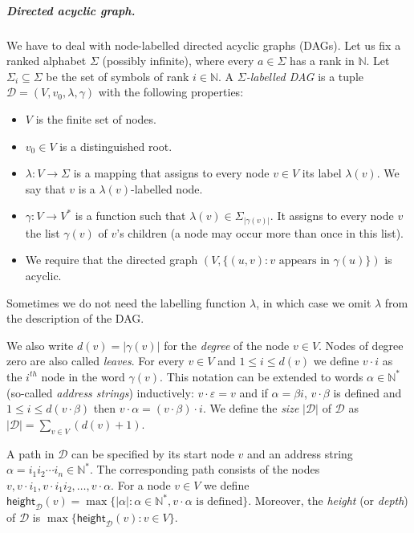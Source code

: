\documentclass[a4paper,UKenglish,cleveref, autoref, thm-restate, numberwithinsect]{lipics-v2021}
\newcommand{\height}{\mathsf{height}}
\begin{document}
\subparagraph{Directed acyclic graph.}
We have to deal with node-labelled directed acyclic graphs (DAGs).
Let us fix a ranked alphabet $\Sigma$ (possibly infinite), where every $a \in \Sigma$ has a rank in $\mathbb{N}$.
Let $\Sigma_i \subseteq \Sigma$ be the set of symbols of rank $i \in \mathbb{N}$.
A  \emph{$\Sigma$-labelled DAG} is a tuple $\mathcal{D} = (V, v_0, \lambda, \gamma)$ with the following properties:
\begin{itemize}
\item $V$ is the finite set of nodes.
\item $v_0 \in V$ is a distinguished root.
\item $\lambda \colon V \to \Sigma$ is a mapping that assigns to every node $v \in V$ its label $\lambda(v)$.
We say that $v$ is a $\lambda(v)$-labelled node.
\item $\gamma \colon V \to V^*$ is a function such that $\lambda(v) \in \Sigma_{|\gamma(v)|}$.
It assigns to every node $v$ the list $\gamma(v)$ of $v$'s children (a node may occur more than once in this list).
\item We require that the directed graph $(V, \{ (u,v) : v \text{ appears in } \gamma(u) \})$ is acyclic.
\end{itemize} 
Sometimes we do not need the labelling function $\lambda$, in which case we omit $\lambda$ from the description of the DAG.

We also write $d(v) = |\gamma(v)|$ for the \emph{degree} of the node $v \in V$. Nodes of degree zero are also called \emph{leaves}.
For every $v \in V$ and $1 \leq i \leq d(v)$ we define $v \cdot i$ as the 
$i^{th}$ node in the word $\gamma(v)$.
This notation can be extended to words $\alpha \in \mathbb{N}^*$ (so-called \emph{address strings}) inductively:
$v \cdot \varepsilon = v$ and if $\alpha = \beta i$, $v \cdot \beta$ is defined and $1 \leq i \leq d(v \cdot \beta)$ then
$v \cdot \alpha = (v \cdot \beta) \cdot i$.
We define the \emph{size} $|\mathcal{D}|$ of $\mathcal{D}$ as $|\mathcal{D}| = \sum_{v \in V} (d(v)+1)$.

A path in $\mathcal{D}$ can be specified by its start node $v$
and an address string $\alpha = i_1 i_2 \cdots i_n \in \mathbb{N}^*$. The corresponding path consists
of the nodes 
$v, v\cdot i_1, v\cdot i_1i_2, \ldots, v\cdot \alpha$.
For a node $v \in V$ we define $\height_{\mathcal{D}}(v) = \max \{ |\alpha| : \alpha \in \mathbb{N}^*, v \cdot \alpha \text{ is defined} \}$.
Moreover, the \emph{height} (or \emph{depth}) of $\mathcal{D}$ is $\max \{ \height_{\mathcal{D}}(v) : v \in V\}$.
\end{document}
